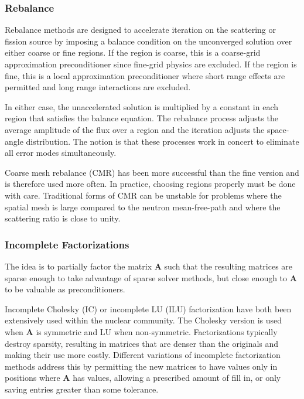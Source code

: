 \documentclass[12pt]{article}
\newcommand{\ve}[1]{\ensuremath{\mathbf{#1}}}
\begin{document}
\subsubsection*{Rebalance}
Rebalance methods are designed to accelerate iteration on the scattering or fission source by imposing a balance condition on the unconverged solution over either coarse or fine regions. If the region is coarse, this is a coarse-grid approximation preconditioner since fine-grid physics are excluded. If the region is fine, this is a local approximation preconditioner where short range effects are permitted and long range interactions are excluded.%

In either case, the unaccelerated solution is multiplied by a constant in each region that satisfies the balance equation. The rebalance process adjusts the average amplitude of the flux over a region and the iteration adjusts the space-angle distribution. The notion is that these processes work in concert to eliminate all error modes simultaneously.%

Coarse mesh rebalance (CMR) has been more successful than the fine version and is therefore used more often. In practice, choosing regions properly must be done with care. %
Traditional forms of CMR can be unstable for problems where the spatial mesh is large compared to the neutron mean-free-path and where the scattering ratio is close to unity.%

\subsubsection*{Incomplete Factorizations}
The idea is to partially factor the matrix $\ve{A}$ such that the resulting matrices are sparse enough to take advantage of sparse solver methods, but close enough to $\ve{A}$ to be valuable as preconditioners.%

Incomplete Cholesky (IC) or incomplete LU (ILU) factorization have both been extensively used within the nuclear community. The Cholesky version is used when $\ve{A}$ is symmetric and LU when non-symmetric. Factorizations typically destroy sparsity, resulting in matrices that are denser than the originals and making their use more costly. Different variations of incomplete factorization methods address this by permitting the new matrices to have values only in positions where $\ve{A}$ has values, allowing a prescribed amount of fill in, or only saving entries greater than some tolerance.%
\end{document}
